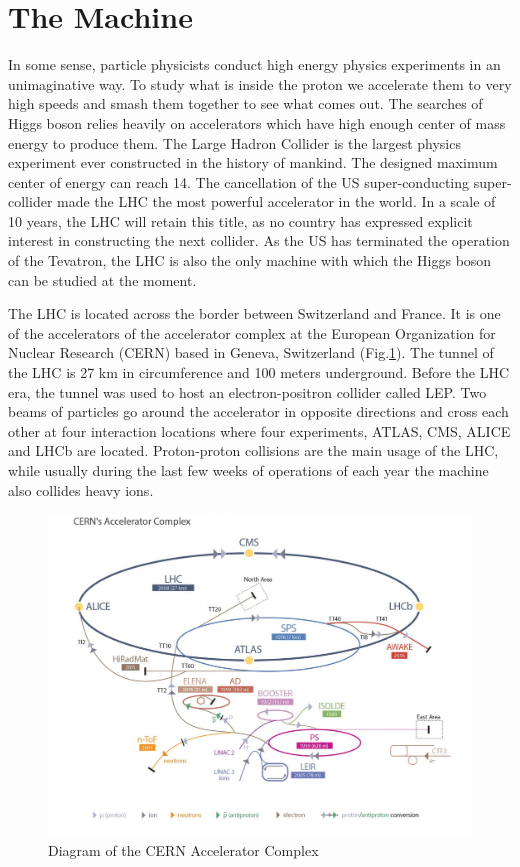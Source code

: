 \section{The Machine}

In some sense, particle physicists conduct high energy physics experiments in an unimaginative way. To study what is inside the proton we accelerate them to very high speeds and smash them together to see what comes out. The searches of Higgs boson relies heavily on accelerators which have high enough center of mass energy to produce them. The Large Hadron Collider is the largest physics experiment ever constructed in the history of mankind. The designed maximum center of energy can reach 14\tev. The cancellation of the US super-conducting super-collider made the LHC the most powerful accelerator in the world. In a scale of 10 years, the LHC will retain this title, as no country has expressed explicit interest in constructing the next collider. As the US has terminated the operation of the Tevatron, the LHC is also the only machine with which the Higgs boson can be studied at the moment.

The LHC is located across the border between Switzerland and France. It is one of the accelerators of the accelerator complex at the European Organization for Nuclear Research (CERN) based in Geneva, Switzerland (Fig.\ref{fig:lhc-CERN}). The tunnel of the LHC is 27 km in circumference and 100 meters underground. Before the LHC era, the tunnel was used to host an electron-positron collider called LEP. Two beams of particles go around the accelerator in opposite directions and cross each other at four interaction locations where four experiments, ATLAS, CMS, ALICE and LHCb are located. Proton-proton collisions are the main usage of the LHC, while usually during the last few weeks of operations of each year the machine also collides heavy ions.

\begin{figure}[htpb!]
\begin{center}
  \includegraphics[width=0.7\linewidth]{figures/LHC/LHC_default}
\caption{Diagram of the CERN Accelerator Complex}
\label{fig:lhc-CERN}
\end{center}
\end{figure}


